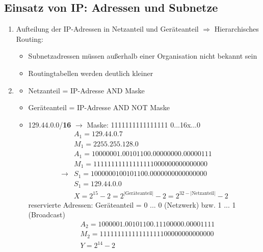 \subsection{Einsatz von IP: Adressen und Subnetze}
\begin{enumerate}
	\item Aufteilung der IP-Adressen in Netzanteil und Geräteanteil $\Rightarrow$ Hierarchisches Routing:
	\begin{itemize}
		\item Subnetzadressen müssen außerhalb einer Organisation nicht bekannt sein
		\item Routingtabellen werden deutlich kleiner
	\end{itemize}
	\item
	\begin{itemize}
		\item Netzanteil = IP-Adresse AND Maske
		\item Geräteanteil = IP-Adresse AND NOT Maske
		\item 129.44.0.0/\textbf{16} $\to$ Maske: 1111111111111111 0...16x...0
		\begin{align*}
			&A_1 = 129.44.0.7\\
			&M_1 = 2255.255.128.0\\
			&A_1 = 1000 0001.00101100.00000000.00000111\\
			&M_1 = 1111111111111111 1000 000000000000\\
			\to &S_1 = 1000000100101100.0000000000000000\\
			&S_1 = 129.44.0.0\\
			&X = 2^{15}-2  = 2^{\text{|Geräteanteil|}}-2 = 2^{32- \text{|Netzanteil|}}-2
		\end{align*}
		reservierte Adressen: Geräteanteil = 0 ... 0 (Netzwerk) bzw. 1 ... 1 (Broadcast)
		\begin{align*}
			&A_2 = 1000001.00101100.11100000.00001111\\
			&M_2 = 1111 1111 1111 1111 1100 0000 0000 0000\\
			&Y = 2^{14} -2
		\end{align*}
	\end{itemize}
\end{enumerate}
